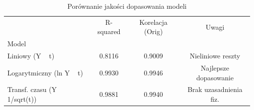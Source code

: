 \begin{table}[H]
\caption{Porównanie jakości dopasowania modeli}
\label{tab:zad4_sum}
\begin{tabular}{lccc}
\toprule
 & R-squared & Korelacja (Orig) & Uwagi \\
Model &  &  &  \\
\midrule
Liniowy (Y ~ t) & 0.8116 & 0.9009 & Nieliniowe reszty \\
Logarytmiczny (ln Y ~ t) & 0.9930 & 0.9946 & Najlepsze dopasowanie \\
Transf. czasu (Y ~ 1/sqrt(t)) & 0.9881 & 0.9940 & Brak uzasadnienia fiz. \\
\bottomrule
\end{tabular}
\end{table}
